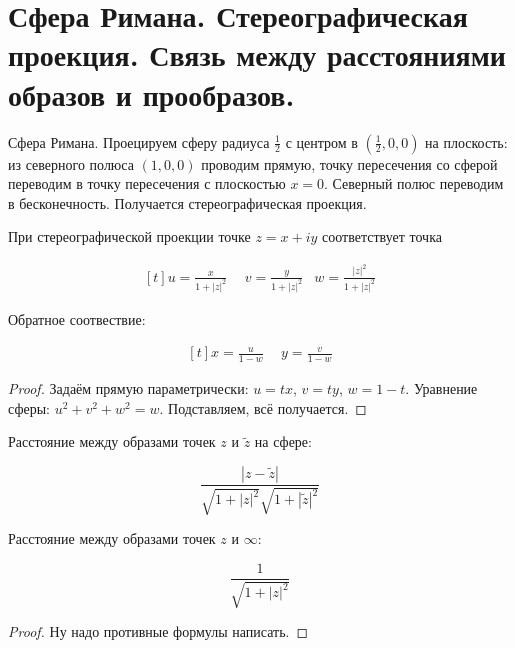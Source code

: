 \section{Сфера Римана. Стереографическая проекция. Связь между расстояниями образов и прообразов.}

\begin{definition}
    Сфера Римана.
    Проецируем сферу радиуса $\frac12$ с центром в $(\frac12, 0, 0)$
    на плоскость: из северного полюса $(1, 0, 0)$
    проводим прямую, точку пересечения со сферой переводим
    в точку пересечения с плоскостью $x = 0$. Северный полюс
    переводим в бесконечность.
    Получается стереографическая проекция.
\end{definition}

\begin{theorem}
    При стереографической проекции точке $z = x + iy$
    соответствует точка

    \[
        \begin{aligned}[t]
            u = \frac{x}{1+|z|^2} & \ \ %
            v = \frac{y}{1+|z|^2} &
            w = \frac{|z|^2}{1+|z|^2}
        \end{aligned}
    \]

    Обратное соотвествие:

    \[
        \begin{aligned}[t]
            x = \frac{u}{1-w} & \ \ %
            y = \frac{v}{1-w}
        \end{aligned}
    \]
\end{theorem}

\begin{proof}
    Задаём прямую параметрически: $u = tx$, $v = ty$, $w = 1 - t$.
    Уравнение сферы: $u^2+v^2+w^2 = w$.
    Подставляем, всё получается.
\end{proof}

\begin{consequence}
    Расстояние между образами точек $z$ и $\widetilde z$
    на сфере:

    \[
        \frac{|z-\widetilde z|}{\sqrt{1+|z|^2}\sqrt{1+|\widetilde z|^2}}
    \]

    Расстояние между образами точек $z$ и $\infty$:

    \[
        \frac{1}{\sqrt{1+|z|^2}}
    \]
\end{consequence}

\begin{proof}
    Ну надо противные формулы написать.
\end{proof}


